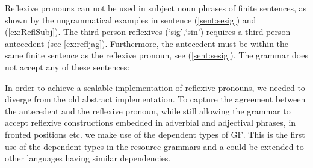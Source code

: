 \documentclass[10pt, a4paper]{article}
\begin{document}
\label{ex:ReflPredet}
\label{ex:ReflConj} \label{ex:ReflConj2}
Reflexive pronouns can not be used in subject noun phrases of finite sentences,
as shown by the ungrammatical examples in 
sentence (\ref{sent:sesig}) and (\ref{ex:ReflSubj}).
The third person reflexives (`sig',`sin') requires a third person antecedent (see \ref{ex:refljag}).
Furthermore, the antecedent must be within the same finite sentence as the reflexive
pronoun, see (\ref{sent:sesig}).
The grammar does not accept any of these sentences:
\label{ex:ReflSubj}
\label{ex:refljag}
\label{sent:sesig}

In order to achieve a scalable implementation of reflexive pronouns, we needed
to diverge from the old abstract implementation. To capture the agreement
between the antecedent and the reflexive pronoun, while still allowing the grammar
to accept reflexive constructions embedded in adverbial and adjectival phrases,
in fronted positions etc. we make use of the dependent types of GF. This is the
first use of the dependent types in the resource grammars and a could be
extended to other languages having similar dependencies.
\end{document}

